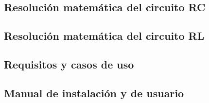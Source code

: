 \documentclass[12pt, a4paper, twoside]{article}
\begin{document}
\begin{umaappendices}
  \section{Resolución matemática del circuito RC}
  
\end{umaappendices}

\begin{umaappendices}
  \section{Resolución matemática del circuito RL}
  
\end{umaappendices}

\begin{umaappendices}
  \section{Requisitos y casos de uso}
  
\end{umaappendices}

\begin{umaappendices}
  \section{Manual de instalación y de usuario}
  
\end{umaappendices}




\end{document}
